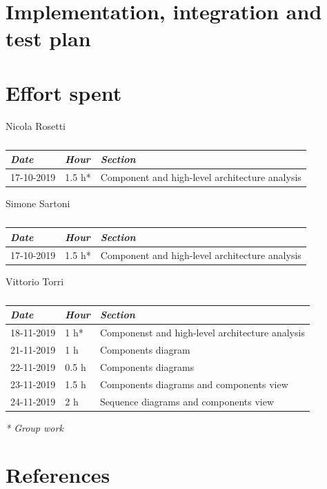 \documentclass[a4paper]{report}
\begin{document}
\chapter{Implementation, integration and test plan}

\chapter{Effort spent}

\begin{table}[H]
\centering
Nicola Rosetti \\
\begin{tabular}{p{2cm}p{1.5cm}p{7cm}}
\toprule
\textit{Date} & \textit{Hour} & \textit{Section} \\ \midrule
17-10-2019 & 1.5 h* & Component and high-level architecture analysis \\ \midrule
\bottomrule
\end{tabular}
\caption[Nicola Rosetti's effort table]{}
\end{table}


\vspace*{1 cm}
\begin{table}[H]
\centering
Simone Sartoni \\
\begin{tabular}{p{2cm}p{1.5cm}p{7cm}}
\toprule
\textit{Date} & \textit{Hour} & \textit{Section} \\ \midrule
17-10-2019 & 1.5 h* & Component and high-level architecture analysis \\ \midrule
\bottomrule
\end{tabular}
\caption[Simone Sartoni's effort table]{}
\end{table}
\vspace*{1 cm}
\begin{table}[H]
\centering
Vittorio Torri \\
\begin{tabular}{p{2cm}p{1.5cm}p{7cm}}
\toprule
\textit{Date} & \textit{Hour} & \textit{Section} \\ \midrule
18-11-2019 & 1 h* & Componenst and high-level architecture analysis \\ \midrule
21-11-2019 & 1 h  & Components diagram \\ \midrule
22-11-2019 & 0.5 h & Components diagrams \\ \midrule
23-11-2019 & 1.5 h & Components diagrams and components view\\ \midrule
24-11-2019 & 2 h & Sequence diagrams and components view \\ \midrule
\bottomrule
\end{tabular}
\caption[Vittorio Torri's effort table]{}
\end{table}
\textit{* Group work}

\chapter{References}
\end{document}
